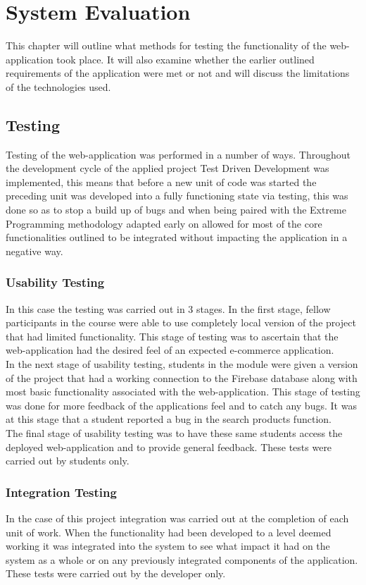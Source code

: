 \chapter{System Evaluation}
This chapter will outline what methods for testing the functionality of the web-application took place. It will also examine whether the earlier outlined requirements of the application were met or not and will discuss the limitations of the technologies used. 

\section{Testing}
Testing of the web-application was performed in a number of ways. Throughout the development cycle of the applied project Test Driven Development was implemented, this means that before a new unit of code was started the preceding unit was developed into a fully functioning state via testing, this was done so as to stop a build up of bugs and when being paired with the Extreme Programming methodology adapted early on allowed for most of the core functionalities outlined to be integrated without impacting the application in a negative way. 

\subsection{Usability Testing}
In this case the testing was carried out in 3 stages. In the first stage, fellow participants in the course were able to use completely local version of the project that had limited functionality. This stage of testing was to ascertain that the web-application had the desired feel of an expected e-commerce application.\\
In the next stage of usability testing, students in the module were given a version of the project that had a working connection to the Firebase database along with most basic functionality associated with the web-application. This stage of testing was done for more feedback of the applications feel and to catch any bugs. It was at this stage that a student reported a bug in the search products function. \\
The final stage of usability testing was to have these same students access the deployed web-application and to provide general feedback. These tests were carried out by students only.

\subsection{Integration Testing}
In the case of this project integration was carried out at the completion of each unit of work. When the functionality had been developed to a level deemed working it was integrated into the system to see what impact it had on the system as a whole or on any previously integrated components of the application. These tests were carried out by the developer only.

